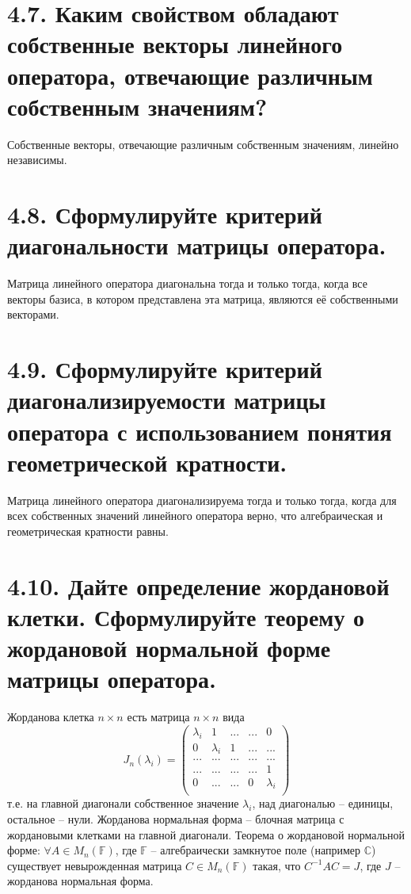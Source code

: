 \documentclass{article}
\begin{document}
\section*{\LARGE 4.7. Каким свойством обладают собственные векторы линейного оператора, отвечающие различным собственным значениям?}
Собственные векторы, отвечающие различным собственным значениям, линейно независимы.

\section*{\LARGE 4.8. Сформулируйте критерий диагональности матрицы оператора.}
Матрица линейного оператора диагональна тогда и только тогда, когда все векторы базиса, в котором представлена эта матрица, являются её собственными векторами. 

\section*{\LARGE 4.9. Сформулируйте критерий диагонализируемости матрицы оператора с использованием понятия геометрической кратности.}
Матрица линейного оператора диагонализируема тогда и только тогда, когда для всех собственных значений линейного оператора верно, что алгебраическая и геометрическая кратности равны.

\section*{\LARGE 4.10. Дайте определение жордановой клетки. Сформулируйте теорему о жордановой нормальной форме матрицы оператора.}
Жорданова клетка $n\times n$ есть матрица $n\times n$ вида
$$
J_n(\lambda_i) = 
\begin{pmatrix}
\lambda_i & 1 & ... & ... & 0 \\
0 & \lambda_i& 1 & ... & ... \\
... & ... & ... & ... & ... \\
... & ... & ... & ... & 1 \\
0 & ... & ... & 0 & \lambda_i \\
\end{pmatrix}
$$
т.е. на главной диагонали собственное значение $\lambda_i$, над диагональю -- единицы, остальное -- нули.
\newline Жорданова нормальная форма -- блочная матрица с жордановыми клетками на главной диагонали.
\newline Теорема о жордановой нормальной форме: $\forall A \in M_n(\mathbb{F})$, где $\mathbb{F}$ -- алгебраически замкнутое поле (например $\mathbb{C}$) существует невырожденная матрица $C \in M_n(\mathbb{F})$ такая, что $C^{-1}AC = J$, где $J$ -- жорданова нормальная форма.
\end{document}
